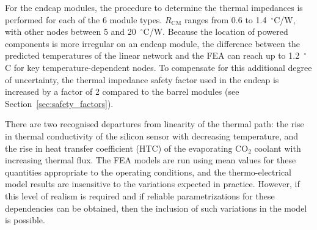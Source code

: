 For the endcap modules, the procedure to determine the thermal impedances is performed for
each of the 6 module types. $R_\text{CM}$ ranges from 0.6 to 1.4~$^\circ$C/W, with other nodes
between 5 and 20~$^\circ$C/W. Because the location of powered components is more irregular on an
endcap module, the difference between the predicted temperatures of the linear network and the FEA
can reach up to 1.2~$^\circ$C for key temperature-dependent nodes. To compensate for this additional
degree of uncertainty, the thermal impedance safety factor used in the endcap is increased by a factor of 2 compared to
the barrel modules (see Section~\ref{sec:safety_factors}).

There are two recognised departures from linearity of the thermal path: the rise in thermal conductivity of the silicon sensor with decreasing temperature, and the rise in heat transfer coefficient (HTC) of the evaporating CO$_2$ coolant with increasing thermal flux. The FEA models are run using mean values for these quantities appropriate to the operating conditions, and the thermo-electrical model results are insensitive to the variations expected in practice. However, if this level of realism is required and if reliable parametrizations for these dependencies can be obtained, then the inclusion of such variations in the model is possible.
